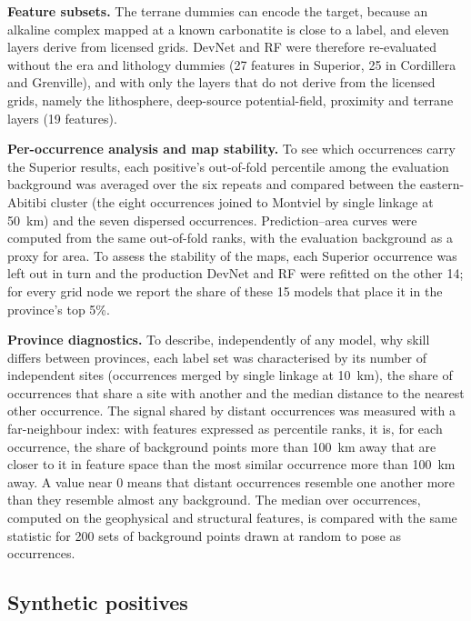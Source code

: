 \documentclass[pdflatex,sn-apa]{sn-jnl}
\begin{document}
\textbf{Feature subsets.} The terrane dummies can encode the target, because an alkaline complex mapped at a known carbonatite is close to a label, and eleven layers derive from licensed grids. DevNet and RF were therefore re-evaluated without the era and lithology dummies (27 features in Superior, 25 in Cordillera and Grenville), and with only the layers that do not derive from the licensed grids, namely the lithosphere, deep-source potential-field, proximity and terrane layers (19 features).

\textbf{Per-occurrence analysis and map stability.} To see which occurrences carry the Superior results, each positive's out-of-fold percentile among the evaluation background was averaged over the six repeats and compared between the eastern-Abitibi cluster (the eight occurrences joined to Montviel by single linkage at 50~km) and the seven dispersed occurrences. Prediction--area curves \citep{YousefiCarranza2015} were computed from the same out-of-fold ranks, with the evaluation background as a proxy for area. To assess the stability of the maps, each Superior occurrence was left out in turn and the production DevNet and RF were refitted on the other 14; for every grid node we report the share of these 15 models that place it in the province's top 5\%.

\textbf{Province diagnostics.} To describe, independently of any model, why skill differs between provinces, each label set was characterised by its number of independent sites (occurrences merged by single linkage at 10~km), the share of occurrences that share a site with another and the median distance to the nearest other occurrence. The signal shared by distant occurrences was measured with a far-neighbour index: with features expressed as percentile ranks, it is, for each occurrence, the share of background points more than 100~km away that are closer to it in feature space than the most similar occurrence more than 100~km away. A value near 0 means that distant occurrences resemble one another more than they resemble almost any background. The median over occurrences, computed on the geophysical and structural features, is compared with the same statistic for 200 sets of background points drawn at random to pose as occurrences.

\subsection{Synthetic positives}\label{sec:augmentation}
\end{document}
